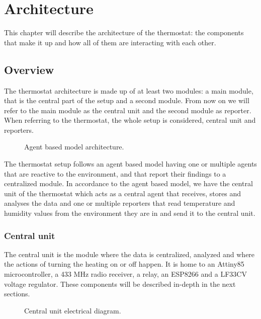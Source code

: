 \chapter{Architecture}
\label{chap:architecture}

\qquad This chapter will describe the architecture of the thermostat: the components that make it up and how
all of them are interacting with each other.

\section{Overview}

The thermostat architecture is made up of at least two modules: a main module, that is the central part of the
setup and a second module. From now on we will refer to the main module as the central unit and the second
module as reporter. When referring to the thermostat, the whole setup is considered, central unit and
reporters.

\begin{figure}[h!]
    \label{fig:general_architecture}
    \centerline{}
    \caption[Architecture Diagram]{Agent based model architecture.}
    \label{fig:general_architecture}
\end{figure}

The thermostat setup follows an agent based model having one or multiple agents that are reactive to the
environment, and that report their findings to a centralized module.
In accordance to the agent based model, we have the central unit of the thermostat which acts as a central
agent that receives, stores and analyses the data and one or multiple reporters that read temperature and
humidity values from the environment they are in and send it to the central unit.



\subsection{Central unit}

\qquad The central unit is the module where the data is centralized, analyzed and where the actions of turning the
heating on or off happen.
It is home to an Attiny85 microcontroller, a 433 MHz radio receiver, a relay, an ESP8266 and a LF33CV voltage
regulator. These components will be described in-depth in the next sections.

\begin{figure}[h!]
    \label{fig:central_unit_diag}
    \centerline{}
    \caption[Central Unit Electrical Diagram]{Central unit electrical diagram.}
    \label{fig:central_unit_diag}
\end{figure}

